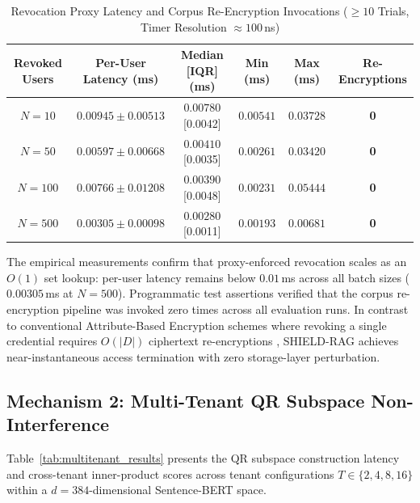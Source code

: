 \documentclass[10pt,a4paper]{article}
\begin{document}
\begin{table}[h]
\centering
\caption{Revocation Proxy Latency and Corpus Re-Encryption Invocations ($\ge 10$ Trials, Timer Resolution $\approx 100$\,ns)}
\label{tab:revocation_results}
\renewcommand{\arraystretch}{1.15}
\small
\begin{tabular}{@{}cccccc@{}}
\toprule
\textbf{Revoked Users} & \textbf{Per-User Latency (ms)} & \textbf{Median [IQR] (ms)} & \textbf{Min (ms)} & \textbf{Max (ms)} & \textbf{Re-Encryptions} \\ \midrule
$N = 10$  & $0.00945 \pm 0.00513$ & $0.00780$ [0.0042] & $0.00541$ & $0.03728$ & \textbf{0} \\
$N = 50$  & $0.00597 \pm 0.00668$ & $0.00410$ [0.0035] & $0.00261$ & $0.03420$ & \textbf{0} \\
$N = 100$ & $0.00766 \pm 0.01208$ & $0.00390$ [0.0048] & $0.00231$ & $0.05444$ & \textbf{0} \\
$N = 500$ & $0.00305 \pm 0.00098$ & $0.00280$ [0.0011] & $0.00193$ & $0.00681$ & \textbf{0} \\ \bottomrule
\end{tabular}
\end{table}

The empirical measurements confirm that proxy-enforced revocation scales as an $O(1)$ set lookup: per-user latency remains below $0.01$\,ms across all batch sizes ($0.00305$\,ms at $N=500$). Programmatic test assertions verified that the corpus re-encryption pipeline was invoked zero times across all evaluation runs. In contrast to conventional Attribute-Based Encryption schemes where revoking a single credential requires $O(|D|)$ ciphertext re-encryptions \cite{ge2024attributebased}, SHIELD-RAG achieves near-instantaneous access termination with zero storage-layer perturbation.

\subsection{Mechanism 2: Multi-Tenant QR Subspace Non-Interference}
Table~\ref{tab:multitenant_results} presents the QR subspace construction latency and cross-tenant inner-product scores across tenant configurations $T \in \{2, 4, 8, 16\}$ within a $d=384$-dimensional Sentence-BERT space.
\end{document}
